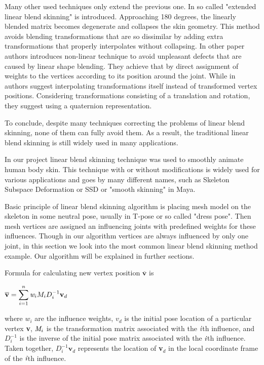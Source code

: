 \documentclass[times, 10pt,twocolumn]{article}
\begin{document}
Many other used techniques only extend the previous one. In \cite{ex2} so called "extended linear blend skinning" is introduced. Approaching 180 degrees, the linearly blended matrix becomes degenerate and collapses the skin geometry. This method avoids blending transformations that are so dissimilar by adding extra transformations that properly interpolates
without collapsing. In other paper \cite{ex8} authors introduces non-linear technique to avoid unpleasant defects that are caused by linear shape blending. They achieve that by direct assignment of weights to the
vertices according to its position around the joint. While in \cite{ex10} authors suggest interpolating transformations itself instead of transformed vertex positions. Considering transformations consisting of a translation and rotation, they suggest using a quaternion representation.

To conclude, despite many techniques correcting the problems of linear blend skinning, none of them can fully avoid them. As a result, the traditional linear blend skinning is still widely used in many applications.

\label{Linear_blend_skinning}

In our project linear blend skinning technique was used to smoothly animate human body skin.
This technique with or without modifications is widely used for various applications and goes by many different names, such as Skeleton Subspace Deformation or SSD or "smooth skinning" in Maya.

Basic principle of linear blend skinning algorithm is placing mesh model on the skeleton in some neutral pose, usually in T-pose or so called "dress pose". Then mesh vertices are assigned an influencing joints with predefined weights for these influences. Though in our algorithm vertices are always influenced by only one joint, in this section we look into the most common linear blend skinning method example. Our algorithm will be explained in further sections.

Formula for calculating new vertex position $ \overline{\textbf{v}} $ is
\begin{center}
$ \overline{\textbf{v}} = \displaystyle\sum_{i=1}^n\emph{w}_{i}M_{i}D_{i}^{-1}\textbf{v}_{d} $
\end{center}
where $w_{i}$ are the influence weights, $v_{d}$ is the initial pose location of a
particular vertex \textbf{v}, $\emph{M}_{i}$ is the transformation matrix associated with
the $\emph{i}$th influence, and $D_{i}^{-1}$ is the inverse of the initial pose matrix
associated with the $\emph{i}$th influence. Taken together, $D_{i}^{-1}\textbf{v}_{d}$ represents
the location of \textbf{v$_{d}$} in the local coordinate frame of the $\emph{i}$th influence.
\end{document}
